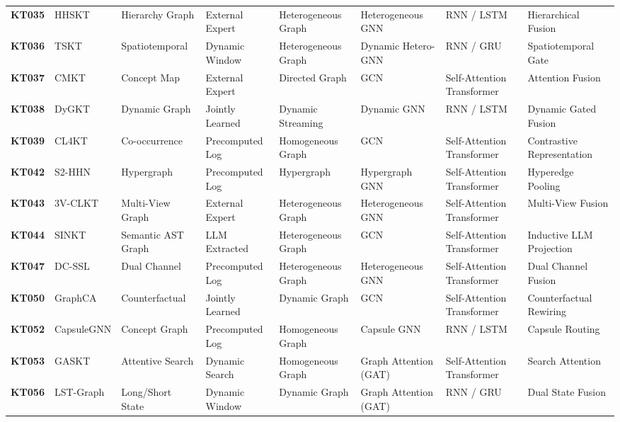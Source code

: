 \documentclass[10pt,journal,compsoc]{IEEEtran}
\begin{document}
\begin{table}[t]
{\begin{tabular}{llllllll}
\textbf{KT035} & HHSKT \cite{KT035_HHSKT_2023} & Hierarchy Graph & External Expert & Heterogeneous Graph & Heterogeneous GNN & RNN / LSTM & Hierarchical Fusion \\
\textbf{KT036} & TSKT \cite{KT036_TSKT_2024} & Spatiotemporal & Dynamic Window & Heterogeneous Graph & Dynamic Hetero-GNN & RNN / GRU & Spatiotemporal Gate \\
\textbf{KT037} & CMKT \cite{KT037_CMKT_2022} & Concept Map & External Expert & Directed Graph & GCN & Self-Attention Transformer & Attention Fusion \\
\textbf{KT038} & DyGKT \cite{KT038_DyGKT_2024} & Dynamic Graph & Jointly Learned & Dynamic Streaming & Dynamic GNN & RNN / LSTM & Dynamic Gated Fusion \\
\textbf{KT039} & CL4KT \cite{KT039_CL4KT_2022} & Co-occurrence & Precomputed Log & Homogeneous Graph & GCN & Self-Attention Transformer & Contrastive Representation \\
\textbf{KT042} & S2-HHN \cite{KT042_S2HHN_2023} & Hypergraph & Precomputed Log & Hypergraph & Hypergraph GNN & Self-Attention Transformer & Hyperedge Pooling \\
\textbf{KT043} & 3V-CLKT \cite{KT043_3VCLKT_2024} & Multi-View Graph & External Expert & Heterogeneous Graph & Heterogeneous GNN & Self-Attention Transformer & Multi-View Fusion \\
\textbf{KT044} & SINKT \cite{KT044_SINKT_2024} & Semantic AST Graph & LLM Extracted & Heterogeneous Graph & GCN & Self-Attention Transformer & Inductive LLM Projection \\
\textbf{KT047} & DC-SSL \cite{KT047_DCSSL_2023} & Dual Channel & Precomputed Log & Heterogeneous Graph & Heterogeneous GNN & Self-Attention Transformer & Dual Channel Fusion \\
\textbf{KT050} & GraphCA \cite{KT050_GraphCA_2023} & Counterfactual & Jointly Learned & Dynamic Graph & GCN & Self-Attention Transformer & Counterfactual Rewiring \\
\textbf{KT052} & CapsuleGNN \cite{KT052_CapsuleGNN_2022} & Concept Graph & Precomputed Log & Homogeneous Graph & Capsule GNN & RNN / LSTM & Capsule Routing \\
\textbf{KT053} & GASKT \cite{KT053_GASKT_2021} & Attentive Search & Dynamic Search & Homogeneous Graph & Graph Attention (GAT) & Self-Attention Transformer & Search Attention \\
\textbf{KT056} & LST-Graph \cite{KT056_LSTGraph_2025} & Long/Short State & Dynamic Window & Dynamic Graph & Graph Attention (GAT) & RNN / GRU & Dual State Fusion \\

\end{tabular}}
\end{table}
\end{document}
